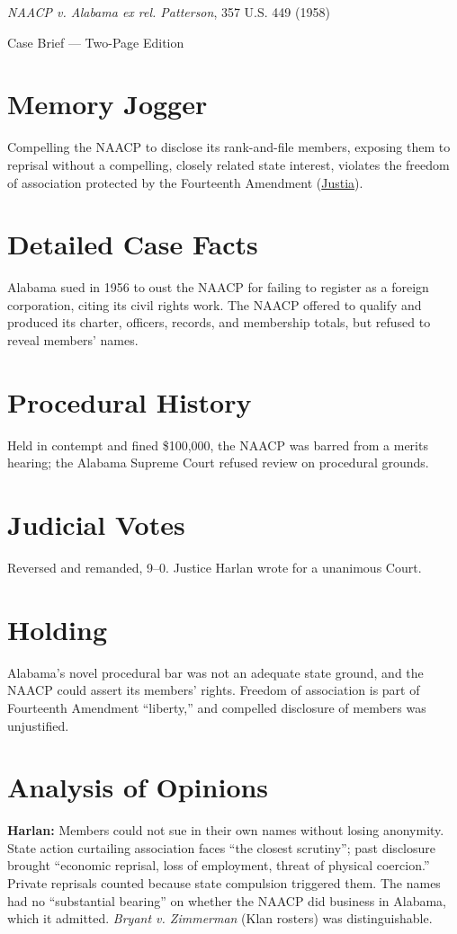 \documentclass[12pt]{article}
\begin{document}
\begin{center}
{\LARGE \textit{NAACP v. Alabama ex rel. Patterson}, 357 U.S. 449 (1958)\par}
\vspace{0.5em}
{\large Case Brief --- Two-Page Edition\par}
\end{center}

\section{Memory Jogger}
Compelling the NAACP to disclose its rank-and-file members, exposing them to reprisal without a compelling, closely related state interest, violates the freedom of association protected by the Fourteenth Amendment (\href{https://supreme.justia.com/cases/federal/us/357/449/}{Justia}).

\section{Detailed Case Facts}
Alabama sued in 1956 to oust the NAACP for failing to register as a foreign corporation, citing its civil rights work. The NAACP offered to qualify and produced its charter, officers, records, and membership totals, but refused to reveal members' names.

\section{Procedural History}
Held in contempt and fined \$100,000, the NAACP was barred from a merits hearing; the Alabama Supreme Court refused review on procedural grounds.

\section{Judicial Votes}
Reversed and remanded, 9--0. Justice Harlan wrote for a unanimous Court.

\section{Holding}
Alabama's novel procedural bar was not an adequate state ground, and the NAACP could assert its members' rights. Freedom of association is part of Fourteenth Amendment ``liberty,'' and compelled disclosure of members was unjustified.

\section{Analysis of Opinions}
\textbf{Harlan:} Members could not sue in their own names without losing anonymity. State action curtailing association faces ``the closest scrutiny''; past disclosure brought ``economic reprisal, loss of employment, threat of physical coercion.'' Private reprisals counted because state compulsion triggered them. The names had no ``substantial bearing'' on whether the NAACP did business in Alabama, which it admitted. \textit{Bryant v. Zimmerman} (Klan rosters) was distinguishable.
\end{document}
